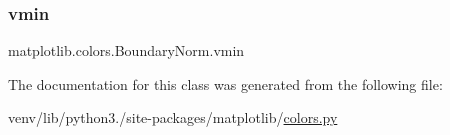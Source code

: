 \mbox{\label{classmatplotlib_1_1colors_1_1BoundaryNorm_a29beedb7f317ef15f3aa6852ad0929d0}} 
\subsubsection{\texorpdfstring{vmin}{vmin}}
{\footnotesize\ttfamily matplotlib.\+colors.\+Boundary\+Norm.\+vmin}



The documentation for this class was generated from the following file\+:\begin{DoxyCompactItemize}
\item 
venv/lib/python3./site-\/packages/matplotlib/\hyperlink{colors_8py}{colors.\+py}\end{DoxyCompactItemize}

